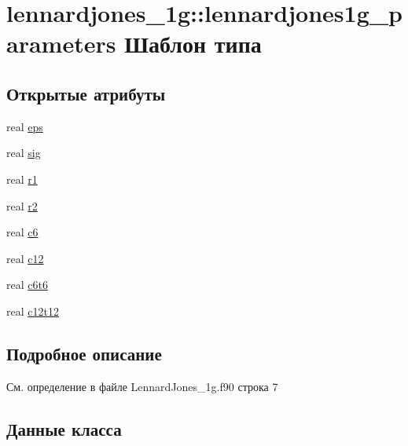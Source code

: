 \hypertarget{structlennardjones__1g_1_1lennardjones1g__parameters}{}\section{lennardjones\+\_\+1g\+:\+:lennardjones1g\+\_\+parameters Шаблон типа}
\label{structlennardjones__1g_1_1lennardjones1g__parameters}
\subsection*{Открытые атрибуты}
\begin{DoxyCompactItemize}
\item 
real \mbox{\hyperlink{structlennardjones__1g_1_1lennardjones1g__parameters_a750108d359052e9d7626761bb6e0dfaa}{eps}}
\item 
real \mbox{\hyperlink{structlennardjones__1g_1_1lennardjones1g__parameters_a88ba8f2d417b65ea5e0aa07171954a15}{sig}}
\item 
real \mbox{\hyperlink{structlennardjones__1g_1_1lennardjones1g__parameters_a7c4b6140f75f4eb0f8c00b15b01728a9}{r1}}
\item 
real \mbox{\hyperlink{structlennardjones__1g_1_1lennardjones1g__parameters_a5f7fe6b683aacc2014ef8573e527508b}{r2}}
\item 
real \mbox{\hyperlink{structlennardjones__1g_1_1lennardjones1g__parameters_a90483776bbf758f100d79cc4902c3ced}{c6}}
\item 
real \mbox{\hyperlink{structlennardjones__1g_1_1lennardjones1g__parameters_a44cabdf352bfd6ae6eda9f03bb956db2}{c12}}
\item 
real \mbox{\hyperlink{structlennardjones__1g_1_1lennardjones1g__parameters_a350fbbd96a4bc274f86ff08921f6b287}{c6t6}}
\item 
real \mbox{\hyperlink{structlennardjones__1g_1_1lennardjones1g__parameters_a8251b4f08d7fd30d611cfa67bb6d0b5e}{c12t12}}
\end{DoxyCompactItemize}


\subsection{Подробное описание}


См. определение в файле Lennard\+Jones\+\_\+1g.\+f90 строка 7



\subsection{Данные класса}
\mbox{\label{structlennardjones__1g_1_1lennardjones1g__parameters_a44cabdf352bfd6ae6eda9f03bb956db2}} 
